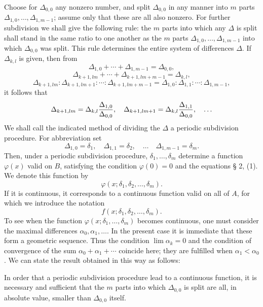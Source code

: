 Choose for $\Delta_{0,0}$ any nonzero number, and split $\Delta_{0,0}$ in any manner into $m$ parts $\Delta_{1,0},\ldots,\Delta_{1,m-1}$; assume only that these are all also nonzero. For further subdivision we shall give the following rule: the $m$ parts into which any $\Delta$ is split shall stand in the same ratio to one another as the $m$ parts $\Delta_{1,0},\ldots,\Delta_{1,m-1}$ into which $\Delta_{0,0}$ was split. This rule determines the entire system of differences $\Delta$. If $\Delta_{k,l}$ is given, then from
\[
 \Delta_{1,0}+\cdots+\Delta_{1,m-1}=\Delta_{0,0},
\]
\[
 \Delta_{k+1,lm}+\cdots+\Delta_{k+1,lm+m-1}=\Delta_{k,l},
\]
\[
 \Delta_{k+1,lm}:\Delta_{k+1,lm+1}:\cdots:\Delta_{k+1,lm+m-1}
 =\Delta_{1,0}:\Delta_{1,1}:\cdots:\Delta_{1,m-1},
\]
it follows that
\[
 \Delta_{k+1,lm}=\Delta_{k,l}{\Delta_{1,0}\over\Delta_{0,0}},
 \quad
 \Delta_{k+1,lm+1}=\Delta_{k,l}{\Delta_{1,1}\over\Delta_{0,0}},
 \quad\ldots
\]
We shall call the indicated method of dividing the $\Delta$ a periodic subdivision procedure. For abbreviation set
\[
 \Delta_{1,0}=\delta_1,
 \quad
 \Delta_{1,1}=\delta_2,
 \quad\ldots\quad
 \Delta_{1,m-1}=\delta_m.
\]
Then, under a periodic subdivision procedure, $\delta_1,\ldots,\delta_m$ determine a function $\varphi(x)$ valid on $B$, satisfying the condition $\varphi(0)=0$ and the equations § 2, (1). We denote this function by
\[
 \varphi(x;\delta_1,\delta_2,\ldots,\delta_m).
\]
If it is continuous, it corresponds to a continuous function valid on all of $A$, for which we introduce the notation
\[
 f(x;\delta_1,\delta_2,\ldots,\delta_m).
\]
To see when the function $\varphi(x;\delta_1,
\ldots,
\delta_m)$ becomes continuous, one must consider the maximal differences $\alpha_0,\alpha_1,
\ldots$. In the present case it is immediate that these form a geometric sequence. Thus the condition $\lim\alpha_k=0$ and the condition of convergence of the sum $\alpha_0+\alpha_1+\cdots$ coincide here; they are fulfilled when $\alpha_1<\alpha_0$. We can state the result obtained in this way as follows:

In order that a periodic subdivision procedure lead to a continuous function, it is necessary and sufficient that the $m$ parts into which $\Delta_{0,0}$ is split are all, in absolute value, smaller than $\Delta_{0,0}$ itself.

